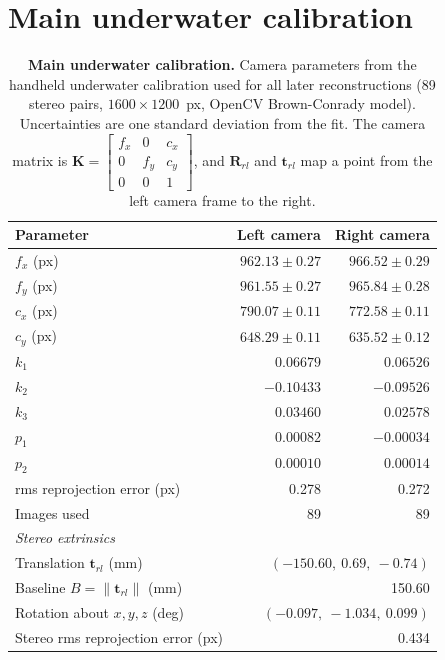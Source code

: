 \section*{Main underwater calibration}
{}
\label{app:main_calibration}
\begin{table}[H]
\centering
\caption[Main underwater calibration]{\textbf{Main underwater calibration.} Camera parameters from the handheld
underwater calibration used for all later reconstructions (89 stereo pairs, $1600\times1200$~px, OpenCV
Brown-Conrady model). Uncertainties are one standard deviation from the fit. The camera matrix is
$\mathbf{K} = \left[\begin{smallmatrix} f_x & 0 & c_x \\ 0 & f_y & c_y \\ 0 & 0 & 1 \end{smallmatrix}\right]$, and
$\mathbf{R}_{rl}$ and $\mathbf{t}_{rl}$ map a point from the left camera frame to the right.}
\label{tab:main_calibration}
\small
\begin{tabular}{lrr}
\toprule
Parameter & Left camera & Right camera \\
\midrule
$f_x$ (px) & $962.13 \pm 0.27$ & $966.52 \pm 0.29$ \\
$f_y$ (px) & $961.55 \pm 0.27$ & $965.84 \pm 0.28$ \\
$c_x$ (px) & $790.07 \pm 0.11$ & $772.58 \pm 0.11$ \\
$c_y$ (px) & $648.29 \pm 0.11$ & $635.52 \pm 0.12$ \\
\midrule
$k_1$ & $0.06679$ & $0.06526$ \\
$k_2$ & $-0.10433$ & $-0.09526$ \\
$k_3$ & $0.03460$ & $0.02578$ \\
$p_1$ & $0.00082$ & $-0.00034$ \\
$p_2$ & $0.00010$ & $0.00014$ \\
\midrule
\acrshort{rms} reprojection error (px) & 0.278 & 0.272 \\
Images used & 89 & 89 \\
\midrule
\multicolumn{3}{l}{\textit{Stereo extrinsics}} \\
Translation $\mathbf{t}_{rl}$ (mm) & \multicolumn{2}{r}{$(-150.60,\ 0.69,\ -0.74)$} \\
Baseline $B = \|\mathbf{t}_{rl}\|$ (mm) & \multicolumn{2}{r}{150.60} \\
Rotation about $x, y, z$ (deg) & \multicolumn{2}{r}{$(-0.097,\ -1.034,\ 0.099)$} \\
Stereo \acrshort{rms} reprojection error (px) & \multicolumn{2}{r}{0.434} \\
\bottomrule
\end{tabular}
\end{table}

